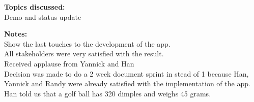 \documentclass[12pt]{article}
\begin{document}
\textbf{Topics discussed:} \\
Demo and status update

\textbf{Notes:} \\
Show the last touches to the development of the app. \\
All stakeholders were very satisfied with the result. \\
Received applause from Yannick and Han \\
Decision was made to do a 2 week document sprint in stead of 1 because Han, Yannick and Randy were already satisfied with the implementation of the app. \\
Han told us that a golf ball has 320 dimples and weighs 45 grams. \\
\end{document}

